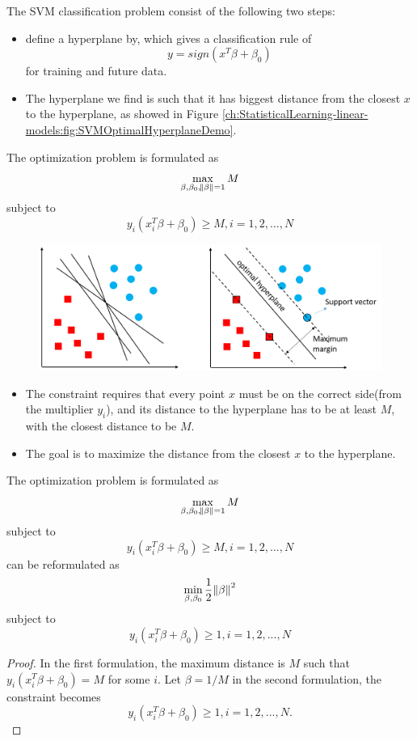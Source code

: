 \begin{refsection}
\begin{definition}
	The SVM classification problem consist of the following two steps:	 
	\begin{itemize}
		\item define a hyperplane by, which gives a classification rule of $$y = sign(x^T\beta + \beta_0)$$
		for training and future data.
		\item The hyperplane we find is such that it has biggest distance from the closest $x$ to the hyperplane, as showed in Figure \autoref{ch:StatisticalLearning-linear-models:fig:SVMOptimalHyperplaneDemo}.   
	\end{itemize}
	The optimization problem is formulated as
	$$\max_{\beta,\beta_0,\norm{\beta} = 1} M$$
	subject to
	$$y_i(x_i^T\beta + \beta_0) \geq M,i=1,2,...,N$$
\end{definition}


\begin{figure}[H]
	\centering
	\includegraphics[width=0.9\linewidth]{../figures/statisticalLearning/linearModelClassification/SVMOptimalHyperplaneDemo}
	\caption{}
	\label{ch:StatisticalLearning-linear-models:fig:SVMOptimalHyperplaneDemo}
\end{figure}


\begin{remark}[interpretation]\hfill
	\begin{itemize}
		\item The constraint requires that every point $x$ must be on the correct side(from the multiplier $y_i$), and its distance to the hyperplane has to be at least $M$, with the closest distance to be $M$.
		\item The goal is to maximize the distance from the closest $x$ to the hyperplane.
	\end{itemize}
\end{remark}

\begin{lemma}
	The optimization problem is formulated as
	$$\max_{\beta,\beta_0,\norm{\beta} = 1} M$$
	subject to
	$$y_i(x_i^T\beta + \beta_0) \geq M,i=1,2,...,N$$
	can be reformulated as
	$$\min_{\beta,\beta_0} \frac{1}{2}\norm{\beta}^2$$
	subject to
	$$y_i(x_i^T\beta + \beta_0) \geq 1,i=1,2,...,N$$
\end{lemma}
\begin{proof}
	In the first formulation, the maximum distance is $M$ such that $y_i(x_i^T\beta + \beta_0) = M$ for some $i$. Let $\beta = 1/M$ in the second formulation, the constraint becomes 
	$$y_i(x_i^T\beta + \beta_0) \geq 1,i=1,2,...,N.$$	
\end{proof}








\end{refsection}
